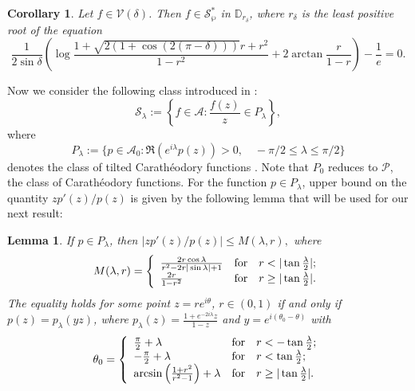 \documentclass[12pt, reqno]{amsart}
\numberwithin{equation}{section}
\theoremstyle{plain}
\newtheorem{corollary}[theorem]{Corollary}
\newtheorem{lemma}{Lemma}[section]
\theoremstyle{definition}
\theoremstyle{remark}
\begin{document}
\begin{corollary}
	Let $f\in \mathcal{V}(\delta)$. Then $f\in \mathcal{S}^*_{\wp}$ in $\mathbb{D}_{r_{\delta}}$, where $r_{\delta}$ is the least positive root of the equation
	\begin{equation*}
	\frac{1}{2\sin{\delta}}\left(\log\frac{1+\sqrt{2(1+\cos(2(\pi-\delta)))}r+r^2}{1-r^2}+2\arctan\frac{r}{1-r}\right)-\frac{1}{e}=0.
	\end{equation*}
\end{corollary} 
Now we consider the following class introduced in \cite{cho2019}:
\begin{equation}\label{s-lamda}
\mathcal{S}_{\lambda}:=\left\{f\in\mathcal{A} : \frac{f(z)}{z} \in P_{\lambda}\right\},
\end{equation}
where 
$$P_{\lambda}:=\{p\in\mathcal{A}_{0}: \Re(e^{i\lambda}p(z))>0,\quad -{\pi}/{2} \leq\lambda\leq {\pi}/{2} \}$$
denotes the class of tilted Carath\'{e}odory functions \cite{tilt}. Note that $P_0$ reduces to $\mathcal{P}$, the class of Carath\'{e}odory functions. For the function $p\in P_{\lambda}$, upper bound on the quantity $zp'(z)/p(z)$ is given by the following lemma that will be used for our next result:
\begin{lemma}\label{tilt-lem}\cite{tilt}
	If $p\in P_{\lambda}$, then
	$\left|{zp'(z)}/{p(z)}\right|\leq M(\lambda,r),$
	where
	\begin{equation*}
	M(\lambda,r)= 
	\left\{
	\begin{array}{lll}
	\frac{2r\cos{\lambda}}{r^2-2r|\sin{\lambda}|+1} & $for$ & r<|\tan\frac{\lambda}{2}|;\\
	\frac{2r}{1-r^2} & $for$ & r\geq |\tan\frac{\lambda}{2}|.	
	\end{array}	
	\right.
	\end{equation*}
	The equality holds for some point $z=re^{i\theta}$, $r\in(0,1)$ if and only if $p(z)=p_{\lambda}(yz)$, where $p_{\lambda}(z)=\frac{1+e^{-2i\lambda}z}{1-z}$ and  $y=e^{i(\theta_{0}-\theta)}$ with 
	\begin{equation*}
	\theta_{0}= 
	\left\{
	\begin{array}{lll}
	\frac{\pi}{2}+\lambda & $for$ & r<-\tan\frac{\lambda}{2};\\
	-\frac{\pi}{2}+\lambda  & $for$ & r< \tan\frac{\lambda}{2};\\
	\arcsin\left(\frac{1+r^2}{r^2-1}\right) +\lambda & $for$ &r\geq|\tan\frac{\lambda}{2}|.	
	\end{array}	
	\right.
	\end{equation*}
\end{lemma}
\end{document}
